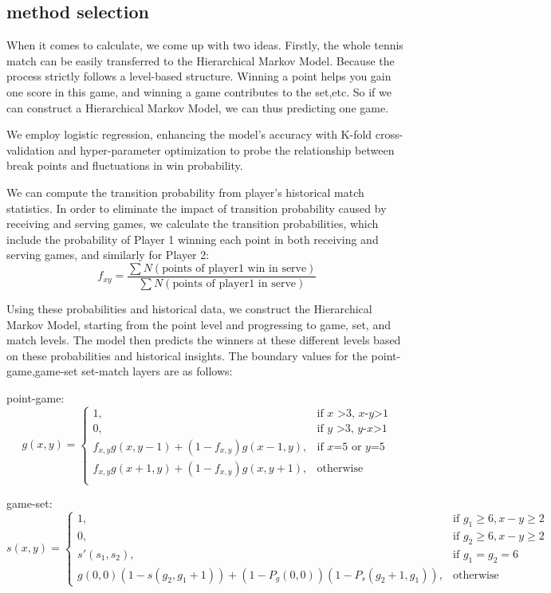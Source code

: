 \documentclass{mcmthesis}
\begin{document}
\subsection{method selection}

When it comes to calculate, we come up with two ideas. Firstly, the whole tennis match can be easily %
transferred to the Hierarchical Markov Model. Because the process strictly follows a level-based %
structure. Winning a point helps you gain one score in this game, and winning a game contributes to the set,etc.
So if we can construct a Hierarchical Markov Model, we can thus predicting one game.%

We employ logistic regression, enhancing the model's accuracy with K-fold cross-validation and %
hyper-parameter optimization to probe the relationship between break points and fluctuations in %
win probability. 

We can compute the transition probability from player's historical match statistics. In order to %
eliminate the impact of transition probability caused by receiving and serving games, we calculate the %
transition probabilities, which include the probability of Player 1 winning each point in both receiving %
and serving games, and similarly for Player 2: %
\[
  f_{xy} = \frac{\sum N(\text{points of player1 win in serve})}{\sum N(\text{points of player1 in serve})}
\]

Using these probabilities %
and historical data, we construct the Hierarchical Markov Model, starting from the point level and%
  progressing to game, set, and match levels. The model then predicts the winners at these different %
levels based on these probabilities and historical insights. The boundary values for the point-game,game-set%
 set-match layers are as follows:

 point-game:
 \[
  g(x,y)=\begin{cases} 1,&\text{if $x$ >3, $x$-$y$>1}\\
    0,&\text{if $y$ >3, $y$-$x$>1}\\
    f_{x,y} g(x,y-1)+(1-f_{x,y}) g(x-1,y),&\text{if $x$=5 or $y$=5}\\
    f_{x,y} g(x+1,y)+(1-f_{x,y}) g(x,y+1),&\text{otherwise}\\    
  \end{cases}
\]

game-set:
 \[
  s(x, y) = 
  \begin{cases} 
  1, & \text{if } g_1 \geq 6, x - y \geq 2 \\
  0, & \text{if } g_2 \geq 6, x - y \geq 2 \\
  s'(s_1, s_2), & \text{if } g_1 = g_2 = 6 \\
  g(0,0)(1 - s(g_2, g_1 + 1)) + (1 - P_g(0,0))(1 - P_s(g_2 + 1, g_1)), & \text{otherwise}
  \end{cases}
\]
\end{document}
